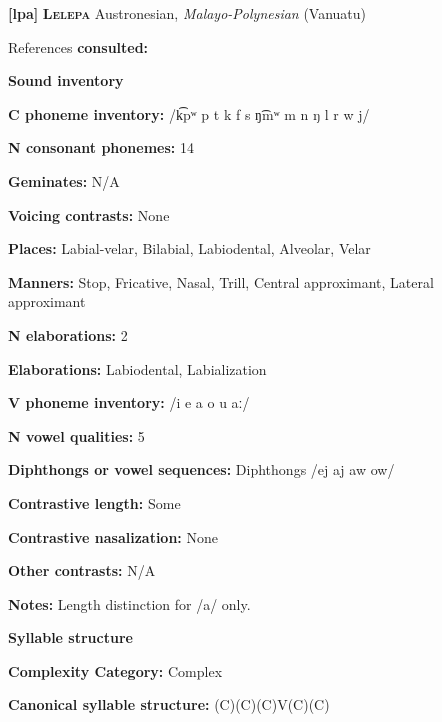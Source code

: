 \textbf{[lpa]}   \textbf{\textsc{Lelepa}}  Austronesian, \textit{Malayo-Polynesian} (Vanuatu)



References \textbf{consulted:} \citet{Lacrampe2014}



\textbf{Sound inventory}



\textbf{C phoneme inventory:} /k͡pʷ p t k f s ŋ͡mʷ m n ŋ l r w j/



\textbf{N consonant phonemes:} 14



\textbf{Geminates:} N/A



\textbf{Voicing contrasts:} None



\textbf{Places:} Labial-velar, Bilabial, Labiodental, Alveolar, Velar



\textbf{Manners:} Stop, Fricative, Nasal, Trill, Central approximant, Lateral approximant



\textbf{N elaborations:} 2



\textbf{Elaborations:} Labiodental, Labialization



\textbf{V phoneme inventory:} /i e a o u aː/



\textbf{N vowel qualities:} 5



\textbf{Diphthongs or vowel sequences:} Diphthongs /ej aj aw ow/



\textbf{Contrastive length:} Some



\textbf{Contrastive nasalization:} None



\textbf{Other contrasts:} N/A



\textbf{Notes:} Length distinction for /a/ only.



\textbf{Syllable structure}



\textbf{Complexity Category:} Complex



\textbf{Canonical syllable structure:} (C)(C)(C)V(C)(C) \citep[41-8]{Lacrampe2014}



